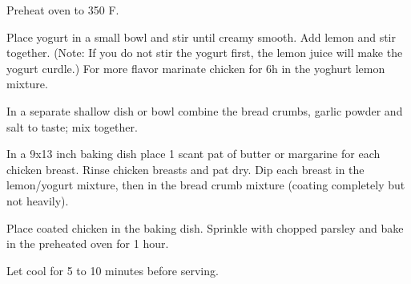 Preheat oven to 350 \degree F.

Place yogurt in a small bowl and stir until creamy smooth. 
Add lemon and stir together. (Note: If you do not stir the yogurt first, the lemon juice will make the yogurt curdle.)
For more flavor marinate chicken for 6h in the yoghurt lemon mixture.

In a separate shallow dish or bowl combine the bread crumbs, garlic powder and salt to taste; mix together.

In a 9x13 inch baking dish place 1 scant pat of butter or margarine for each chicken breast. 
Rinse chicken breasts and pat dry. Dip each breast in the lemon/yogurt mixture, then in the bread crumb mixture (coating completely but not heavily).

Place coated chicken in the baking dish. Sprinkle with chopped parsley and bake in the preheated oven for 1 hour. 

Let cool for 5 to 10 minutes before serving.